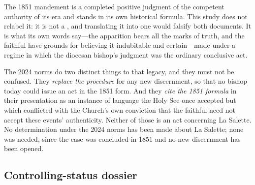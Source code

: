 The 1851 mandement is a completed positive judgment of the competent
authority of its era and stands in its own historical formula. This
study does not relabel it: it is not a , and
translating it into one would falsify both documents. It is what its
own words say---the apparition bears all the marks of truth, and the
faithful have grounds for believing it indubitable and certain---made
under a regime in which the diocesan bishop's judgment was the
ordinary conclusive act.

The 2024 norms do two distinct things to that legacy, and they must
not be confused. They \emph{replace the procedure} for any new
discernment, so that no bishop today could issue an act in the 1851
form. And they \emph{cite the 1851 formula} in their presentation as
an instance of language the Holy See once accepted but which
conflicted with the Church's own conviction that the faithful need
not accept these events' authenticity. Neither of those is an act
concerning La Salette. No determination under the 2024 norms has been
made about La Salette; none was needed, since the case was concluded
in 1851 and no new discernment has been opened.

\subsection{Controlling-status dossier}

